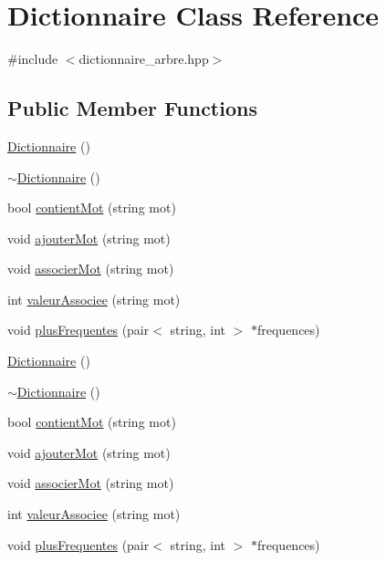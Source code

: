 \hypertarget{class_dictionnaire}{\section{Dictionnaire Class Reference}
\label{class_dictionnaire}
}


{\ttfamily \#include $<$dictionnaire\-\_\-arbre.\-hpp$>$}

\subsection*{Public Member Functions}
\begin{DoxyCompactItemize}
\item 
\hyperlink{class_dictionnaire_a269116344596a7441062906bd8857b0a}{Dictionnaire} ()
\item 
\hyperlink{class_dictionnaire_a1421a1ff914425472e7ddc41bf536775}{$\sim$\-Dictionnaire} ()
\item 
bool \hyperlink{class_dictionnaire_a7821613d5c6e03b481d678bb982d29c9}{contient\-Mot} (string mot)
\item 
void \hyperlink{class_dictionnaire_add484040376d8e35b086df1222f5dc03}{ajouter\-Mot} (string mot)
\item 
void \hyperlink{class_dictionnaire_a8d1de380d1b5776234c94a313f0f521e}{associer\-Mot} (string mot)
\item 
int \hyperlink{class_dictionnaire_a9eb8f3eec4f1b666dca15db7142d8d35}{valeur\-Associee} (string mot)
\item 
void \hyperlink{class_dictionnaire_a087c9d8cf97ab57e9672d2648aeba80f}{plus\-Frequentes} (pair$<$ string, int $>$ $\ast$frequences)
\item 
\hyperlink{class_dictionnaire_a269116344596a7441062906bd8857b0a}{Dictionnaire} ()
\item 
\hyperlink{class_dictionnaire_a1421a1ff914425472e7ddc41bf536775}{$\sim$\-Dictionnaire} ()
\item 
bool \hyperlink{class_dictionnaire_a7821613d5c6e03b481d678bb982d29c9}{contient\-Mot} (string mot)
\item 
void \hyperlink{class_dictionnaire_add484040376d8e35b086df1222f5dc03}{ajouter\-Mot} (string mot)
\item 
void \hyperlink{class_dictionnaire_a8d1de380d1b5776234c94a313f0f521e}{associer\-Mot} (string mot)
\item 
int \hyperlink{class_dictionnaire_a9eb8f3eec4f1b666dca15db7142d8d35}{valeur\-Associee} (string mot)
\item 
void \hyperlink{class_dictionnaire_a087c9d8cf97ab57e9672d2648aeba80f}{plus\-Frequentes} (pair$<$ string, int $>$ $\ast$frequences)
\end{DoxyCompactItemize}
